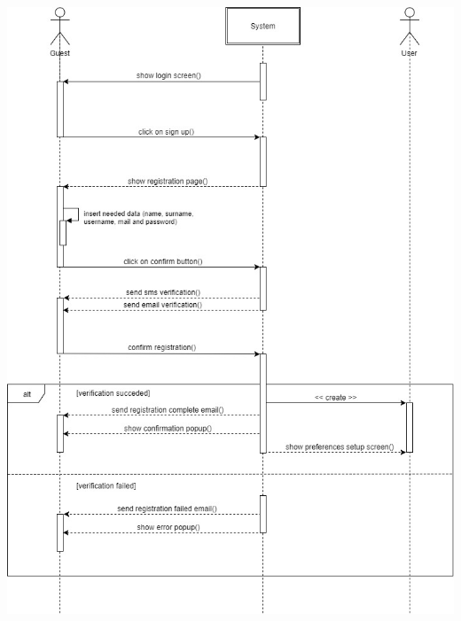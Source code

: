\begin{center}
\includegraphics[scale=0.55]{MainMatter/images/sequencediagrams/signup}
\end{center}

